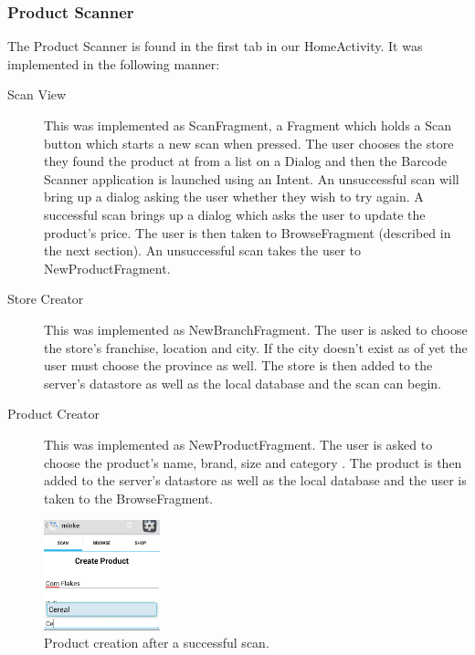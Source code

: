 \subsubsection{Product Scanner}
The Product Scanner is found in the first tab in our HomeActivity. It was
implemented in the following manner:
\begin{description}
\item[Scan View] This was implemented as ScanFragment, a Fragment which holds a
Scan button which starts a new scan when pressed. The user chooses the store
they found the product at from a list on a Dialog and then the Barcode Scanner
application is launched using an Intent. An unsuccessful scan will bring up a
dialog asking the user whether they wish to try again. A successful scan brings
up a dialog which asks the user to update the product's price. The user is then
taken to BrowseFragment (described in the next section). An unsuccessful scan
takes the user to NewProductFragment.
\item[Store Creator] This was implemented as NewBranchFragment. The user is
asked to choose the store's franchise, location and city. If the city doesn't
exist as of yet the user must choose the province as well. The store is then
added to the server's datastore as well as the local database and the scan can
begin.
\item[Product Creator] This was implemented as NewProductFragment. The user is
asked to choose the product's name, brand, size and category . The product is
then added to the server's datastore as well as the local database and the user
is taken to the BrowseFragment.
\end{description} 
 \begin{figure}[h!]
\centering
\includegraphics[width=0.3\textwidth]{new-product.png}
\caption{Product creation after a successful scan.}
\end{figure}
